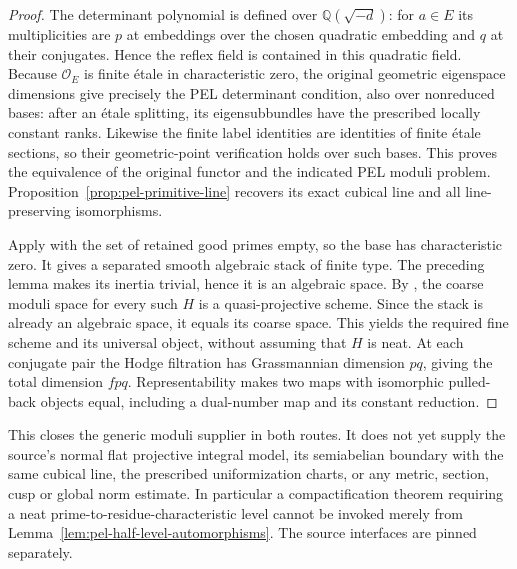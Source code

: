 \begin{proof}
The determinant polynomial is defined over
$\mathbb Q(\sqrt{-d})$: for $a\in E$ its multiplicities are $p$ at
embeddings over the chosen quadratic embedding and $q$ at their
conjugates. Hence the reflex field is contained in this quadratic
field. Because $\mathcal O_E$ is finite \'etale in characteristic zero,
the original geometric eigenspace dimensions give precisely the PEL
determinant condition, also over nonreduced bases: after an \'etale
splitting, its eigensubbundles have the prescribed locally constant
ranks. Likewise the finite label identities are identities of finite
\'etale sections, so their geometric-point verification holds over
such bases. This proves the equivalence of the original functor and
the indicated PEL moduli problem. Proposition~\ref{prop:pel-primitive-line}
recovers its exact cubical line and all line-preserving isomorphisms.

Apply \cite[Theorem 1.4.1.11]{generic-pel-lan} with the set of retained
good primes empty, so the base has characteristic zero. It gives a
separated smooth algebraic stack of finite type. The preceding lemma
makes its inertia trivial, hence it is an algebraic space.
By \cite[Corollary 7.2.3.10]{generic-pel-lan}, the coarse moduli space
for every such $H$ is a quasi-projective scheme. Since the stack is
already an algebraic space, it equals its coarse space. This yields
the required fine scheme and its universal object, without assuming
that $H$ is neat. At each conjugate pair the Hodge filtration has
Grassmannian dimension $pq$, giving the total dimension $fpq$.
Representability makes two maps with isomorphic pulled-back objects
equal, including a dual-number map and its constant reduction.
\end{proof}

This closes the generic moduli supplier in both routes. It does not
yet supply the source's normal flat projective integral model, its
semiabelian boundary with the same cubical line, the prescribed
uniformization charts, or any metric, section, cusp or global norm
estimate. In particular a compactification theorem requiring a neat
prime-to-residue-characteristic level cannot be invoked merely from
Lemma~\ref{lem:pel-half-level-automorphisms}.
The source interfaces are pinned separately\cite{generic-pel-source}.
